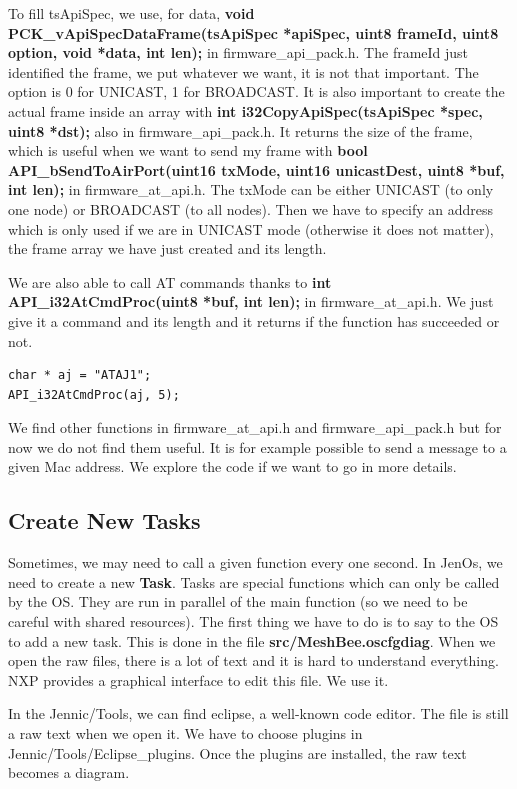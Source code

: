 To fill tsApiSpec, we use, for data, \textbf{void PCK\_vApiSpecDataFrame(tsApiSpec *apiSpec, uint8 frameId, uint8 option, void *data, int len);} in firmware\_api\_pack.h. The frameId just identified the frame, we put whatever we want, it is not that important. The option is 0 for UNICAST, 1 for BROADCAST. It is also important to create the actual frame inside an array with \textbf{int i32CopyApiSpec(tsApiSpec *spec, uint8 *dst);} also in firmware\_api\_pack.h. It returns the size of the frame, which is useful when we want to send my frame with \textbf{bool API\_bSendToAirPort(uint16 txMode, uint16 unicastDest, uint8 *buf, int len);} in firmware\_at\_api.h. The txMode can be either UNICAST (to only one node) or BROADCAST (to all nodes). Then we have to specify an address which is only used if we are in UNICAST mode (otherwise it does not matter), the frame array we have just created and its length.

We are also able to call AT commands thanks to \textbf{int API\_i32AtCmdProc(uint8 *buf, int len);} in firmware\_at\_api.h. We just give it a command and its length and it returns if the function has succeeded or not.

\begin{lstlisting}[frame=single]
char * aj = "ATAJ1";
API_i32AtCmdProc(aj, 5);
\end{lstlisting}

We find other functions in firmware\_at\_api.h and firmware\_api\_pack.h but for now we do not find them useful. It is for example possible to send a message to a given Mac address. We explore the code if we want to go in more details.

\subsection{Create New Tasks}

Sometimes, we may need to call a given function every one second. In JenOs, we need to create a new \textbf{Task}. Tasks are special functions which can only be called by the OS. They are run in parallel of the main function (so we need to be careful with shared resources). The first thing we have to do is to say to the OS to add a new task. This is done in the file \textbf{src/MeshBee.oscfgdiag}. When we open the raw files, there is a lot of text and it is hard to understand everything. NXP provides a graphical interface to edit this file. We use it.

In the Jennic/Tools, we can find eclipse, a well-known code editor. The file is still a raw text when we open it. We have to choose plugins in Jennic/Tools/Eclipse\_plugins. Once the plugins are installed, the raw text becomes a diagram.

